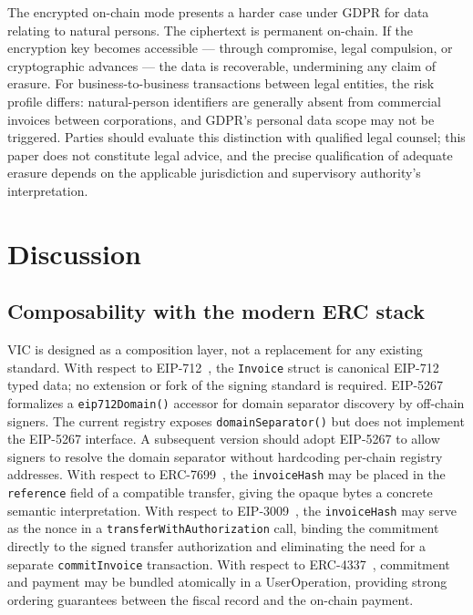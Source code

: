 \documentclass[11pt,a4paper]{article}
\begin{document}
The encrypted on-chain mode presents a harder case under GDPR for data relating to natural persons. The ciphertext is permanent on-chain. If the encryption key becomes accessible --- through compromise, legal compulsion, or cryptographic advances --- the data is recoverable, undermining any claim of erasure. For business-to-business transactions between legal entities, the risk profile differs: natural-person identifiers are generally absent from commercial invoices between corporations, and GDPR's personal data scope may not be triggered. Parties should evaluate this distinction with qualified legal counsel; this paper does not constitute legal advice, and the precise qualification of adequate erasure depends on the applicable jurisdiction and supervisory authority's interpretation.

\section{Discussion}
\label{sec:discussion}

\subsection{Composability with the modern ERC stack}

VIC is designed as a composition layer, not a replacement for any existing standard. With respect to EIP-712~\cite{eip712}, the \texttt{Invoice} struct is canonical EIP-712 typed data; no extension or fork of the signing standard is required. EIP-5267~\cite{eip5267} formalizes a \texttt{eip712Domain()} accessor for domain separator discovery by off-chain signers. The current registry exposes \texttt{domainSeparator()} but does not implement the EIP-5267 interface. A subsequent version should adopt EIP-5267 to allow signers to resolve the domain separator without hardcoding per-chain registry addresses. With respect to ERC-7699~\cite{erc7699}, the \texttt{invoiceHash} may be placed in the \texttt{reference} field of a compatible transfer, giving the opaque bytes a concrete semantic interpretation. With respect to EIP-3009~\cite{eip3009}, the \texttt{invoiceHash} may serve as the nonce in a \texttt{transferWithAuthorization} call, binding the commitment directly to the signed transfer authorization and eliminating the need for a separate \texttt{commitInvoice} transaction. With respect to ERC-4337~\cite{erc4337}, commitment and payment may be bundled atomically in a UserOperation, providing strong ordering guarantees between the fiscal record and the on-chain payment.
\end{document}
